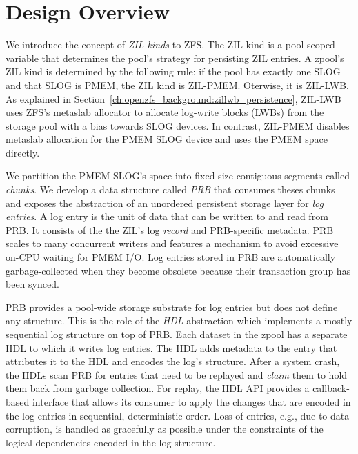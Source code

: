 \documentclass[12pt,a4paper,twoside]{book}
\begin{document}
\section{Design Overview}\label{sec:designoverview}
We introduce the concept of \textit{ZIL kinds} to ZFS.
The ZIL kind is a pool-scoped variable that determines the pool's strategy for persisting ZIL entries.
A zpool's ZIL kind is determined by the following rule:
if the pool has exactly one SLOG and that SLOG is PMEM, the ZIL kind is ZIL-PMEM. Oterwise, it is ZIL-LWB.
As explained in Section~\ref{ch:openzfs_background:zillwb_persistence}, ZIL-LWB uses ZFS's metaslab allocator to allocate log-write blocks (LWBs) from the storage pool with a bias towards SLOG devices.
In contrast, ZIL-PMEM disables metaslab allocation for the PMEM SLOG device and uses the PMEM space directly.

We partition the PMEM SLOG's space into fixed-size contiguous segments called \textit{chunks}.
We develop a data structure called \textit{PRB} that consumes theses chunks and exposes the abstraction of an unordered persistent storage layer for \textit{log entries}.
A log entry is the unit of data that can be written to and read from PRB.
It consists of the the ZIL's log \textit{record} and PRB-specific metadata.
PRB scales to many concurrent writers and features a mechanism to avoid excessive on-CPU waiting for PMEM I/O.
Log entries stored in PRB are automatically garbage-collected when they become obsolete because their transaction group has been synced.

PRB provides a pool-wide storage substrate for log entries but does not define any structure.
This is the role of the \textit{HDL} abstraction which implements a mostly sequential log structure on top of PRB.
Each dataset in the zpool has a separate HDL to which it writes log entries.
The HDL adds metadata to the entry that attributes it to the HDL and encodes the log's structure.
After a system crash, the HDLs scan PRB for entries that need to be replayed and \textit{claim} them to hold them back from garbage collection.
For replay, the HDL API provides a callback-based interface that allows its consumer to apply the changes that are encoded in the log entries in sequential, deterministic order.
Loss of entries, e.g., due to data corruption, is handled as gracefully as possible under the constraints of the logical dependencies encoded in the log structure.
\end{document}
